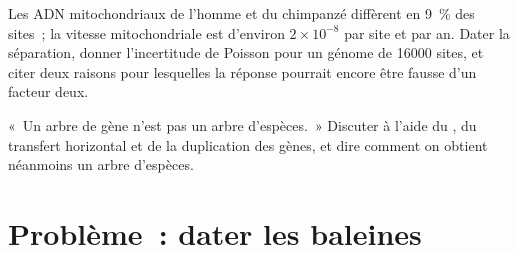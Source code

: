 \begin{exercise}[$\star\star\star$]\label{exo:b2:phylogenetic-trees:11}
Les ADN mitochondriaux de l'homme et du chimpanzé diffèrent en \qty{9}{\%}
des sites~; la vitesse mitochondriale est d'environ $2\times 10^{-8}$ par
site et par an. Dater la séparation, donner l'incertitude de Poisson pour
un génome de
\qty{16000}{} sites, et citer deux raisons pour lesquelles la réponse
pourrait encore être fausse d'un facteur deux.
\end{exercise}

\begin{exercise}[$\star\star\star$]\label{exo:b2:phylogenetic-trees:12}
«~Un arbre de gène n'est pas un arbre d'espèces.~» Discuter à l'aide du
, du transfert horizontal et de la duplication
des gènes, et dire comment on obtient néanmoins un arbre d'espèces.
\end{exercise}
\section{Problème~: dater les baleines}

